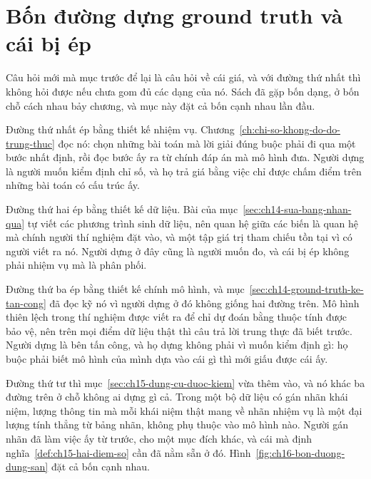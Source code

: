 \section{Bốn đường dựng ground truth và cái bị ép}
\label{sec:ch16-bon-duong-dung-san}

%
Câu hỏi mới mà mục trước để lại là câu hỏi về cái giá, và với đường thứ nhất thì
không hỏi được nếu chưa gom đủ các dạng của nó. Sách đã gặp bốn dạng, ở bốn chỗ
cách nhau bảy chương, và mục này đặt cả bốn cạnh nhau lần đầu.

%
Đường thứ nhất ép bằng thiết kế nhiệm vụ.
Chương~\ref{ch:chi-so-khong-do-do-trung-thuc} đọc nó: chọn những bài toán mà lời
giải đúng buộc phải đi qua một bước nhất định, rồi đọc bước ấy ra từ chính đáp
án mà mô hình đưa. Người dựng là người muốn kiểm định chỉ số, và họ trả giá bằng
việc chỉ được chấm điểm trên những bài toán có cấu trúc ấy.

%
Đường thứ hai ép bằng thiết kế dữ liệu. Bài của
mục~\ref{sec:ch14-sua-bang-nhan-qua} tự viết các phương trình sinh dữ liệu, nên
quan hệ giữa các biến là quan hệ mà chính người thí nghiệm đặt vào, và một tập
giá trị tham chiếu tồn tại vì có người viết ra nó. Người dựng ở đây cũng là
người muốn đo, và cái bị ép không phải nhiệm vụ mà là phân phối.

%
Đường thứ ba ép bằng thiết kế chính mô hình, và
mục~\ref{sec:ch14-ground-truth-ke-tan-cong} đã đọc kỹ nó vì người dựng ở đó
không giống hai đường trên. Mô hình thiên lệch trong thí nghiệm
 được viết ra để chỉ dự đoán bằng thuộc tính
được bảo vệ, nên trên mọi điểm dữ liệu thật thì câu trả lời trung thực đã biết
trước. Người dựng là bên tấn công, và họ dựng không phải vì muốn kiểm định gì:
họ buộc phải biết mô hình của mình dựa vào cái gì thì mới giấu được cái ấy.

%
Đường thứ tư thì mục~\ref{sec:ch15-dung-cu-duoc-kiem} vừa thêm vào, và nó khác
ba đường trên ở chỗ không ai dựng gì cả. Trong một bộ dữ liệu có gán nhãn khái
niệm, lượng thông tin mà mỗi khái niệm thật mang về nhãn nhiệm vụ là một đại
lượng tính thẳng từ bảng nhãn, không phụ thuộc vào mô hình nào. Người gán nhãn
đã làm việc ấy từ trước, cho một mục đích khác, và cái mà
định nghĩa~\ref{def:ch15-hai-diem-so} cần đã nằm sẵn ở đó.
Hình~\ref{fig:ch16-bon-duong-dung-san} đặt cả bốn cạnh nhau.

